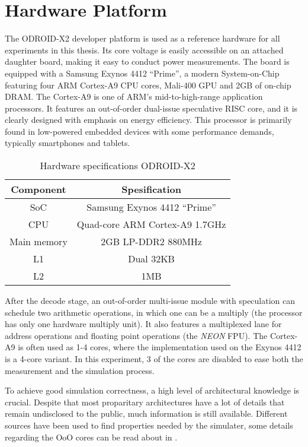 \section{Hardware Platform}

The ODROID-X2 developer platform \cite{hardkernelodroidx2} is used as a
reference hardware for all experiments in this thesis. Its core voltage is
easily accessible on an attached daughter board, making it easy to conduct
power measurements. The board is equipped with a Samsung Exynos 4412 ``Prime'',
a modern System-on-Chip featuring four ARM Cortex-A9 CPU cores, Mali-400 GPU and
2GB of on-chip DRAM. The Cortex-A9 is one of ARM's mid-to-high-range application
processors. It features an out-of-order dual-issue speculative RISC core, and it
is clearly designed with emphasis on energy efficiency. This processor is
primarily found in low-powered embedded devices with some performance demands,
typically smartphones and tablets.

    \begin{table}
        \centering
        \begin{tabular}{|c|c|}
            \hline
            Component   & Spesification\\
            \hline
            SoC         & Samsung Exynos 4412 ``Prime'' \\
            CPU         & Quad-core ARM Cortex-A9 1.7GHz \\
            Main memory & 2GB LP-DDR2 880MHz \\
            L1          & Dual 32KB \\
            L2          & 1MB \\
            \hline
        \end{tabular}
        \caption{Hardware specifications ODROID-X2}
        \label{tab:hwspecx2}
    \end{table}

After the decode stage, an out-of-order multi-issue module with speculation can
schedule two arithmetic operations, in which one can be a multiply (the
processor has only one hardware multiply unit). It also features a multiplexed lane
for address operations and floating point operations (the \emph{NEON} FPU). The
Cortex-A9 is often used as 1-4 cores\cite{armsite}, where the implementation
used on the Exynos 4412 is a 4-core variant\cite{somesite}. In this experiment,
3 of the cores are disabled to ease both the measurement and the simulation
process.

To achieve good simulation correctness, a high level of architectural knowledge
is crucial. Despite that most proparitary architectures have a lot of details
that remain undisclosed to the public, much information is still available.
Different sources have been used to find properties needed by the simulater,
some details regarding the OoO cores can be read about in
\cite{blem2013detailed}.
